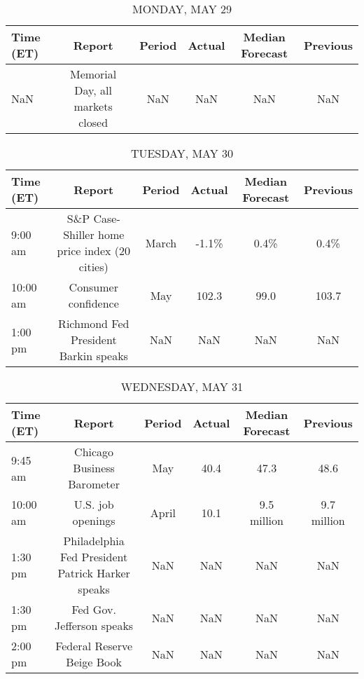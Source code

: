 \documentclass{article}%
\begin{document}
%
\normalsize%


\begin{table}[htbp]%
\caption{MONDAY, MAY 29}%
\centering%
\begin{adjustbox}{width=1\textwidth}%
\begin{tabular}{lccccc}
\toprule
Time (ET) &                           Report & Period & Actual & Median Forecast & Previous \\
\midrule
      NaN & Memorial Day, all markets closed &    NaN &    NaN &             NaN &      NaN \\
\bottomrule
\end{tabular}
%
\end{adjustbox}%
\end{table}

%


\begin{table}[htbp]%
\caption{TUESDAY, MAY 30}%
\centering%
\begin{adjustbox}{width=1\textwidth}%
\begin{tabular}{lccccc}
\toprule
Time (ET) &                                        Report & Period & Actual & Median Forecast & Previous \\
\midrule
  9:00 am & S\&P Case-Shiller home price index (20 cities) &  March &  -1.1\% &            0.4\% &     0.4\% \\
 10:00 am &                           Consumer confidence &    May &  102.3 &            99.0 &    103.7 \\
  1:00 pm &          Richmond Fed President Barkin speaks &    NaN &    NaN &             NaN &      NaN \\
\bottomrule
\end{tabular}
%
\end{adjustbox}%
\end{table}

%


\begin{table}[htbp]%
\caption{WEDNESDAY, MAY 31}%
\centering%
\begin{adjustbox}{width=1\textwidth}%
\begin{tabular}{lccccc}
\toprule
Time (ET) &                                           Report & Period & Actual & Median Forecast &    Previous \\
\midrule
  9:45 am &                       Chicago Business Barometer &    May &   40.4 &            47.3 &        48.6 \\
 10:00 am &                                U.S. job openings &  April &   10.1 &     9.5 million & 9.7 million \\
  1:30 pm & Philadelphia Fed President Patrick Harker speaks &    NaN &    NaN &             NaN &         NaN \\
  1:30 pm &                        Fed Gov. Jefferson speaks &    NaN &    NaN &             NaN &         NaN \\
  2:00 pm &                       Federal Reserve Beige Book &    NaN &    NaN &             NaN &         NaN \\
\bottomrule
\end{tabular}
%
\end{adjustbox}%
\end{table}
\end{document}
